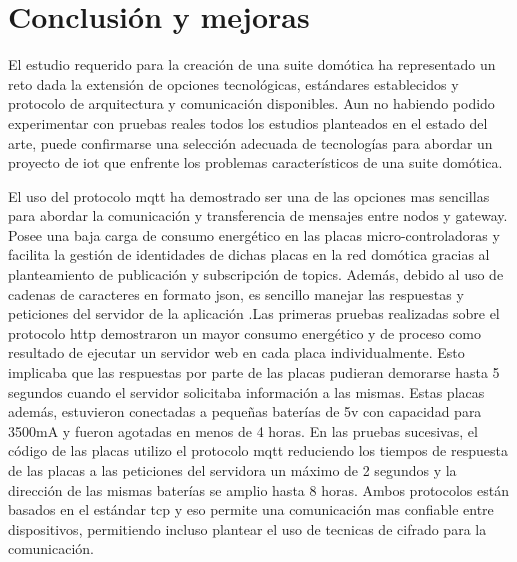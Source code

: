 \cleardoublepage

\chapter{Conclusión y mejoras}
\label{ch:Capitulo6}


El estudio requerido para la creación de una suite domótica ha representado un reto dada la extensión de opciones tecnológicas, estándares establecidos y protocolo de arquitectura y comunicación disponibles. Aun no habiendo podido experimentar con pruebas reales todos los estudios planteados en el estado del arte, puede confirmarse una selección adecuada de tecnologías para abordar un proyecto de \gls{iot} que enfrente los problemas característicos de una suite domótica.

\vspace{1cm}

El uso del protocolo \gls{mqtt} ha demostrado ser una de las opciones mas sencillas para abordar la comunicación y transferencia de mensajes entre nodos y \gls{gateway}. Posee una baja carga de consumo energético en las placas micro-controladoras y facilita la gestión de identidades de dichas placas en la red domótica gracias al planteamiento de publicación y subscripción de topics. Además, debido al uso de cadenas de caracteres en formato \gls{json}, es sencillo manejar las respuestas y peticiones del servidor de la aplicación .Las primeras pruebas realizadas sobre el protocolo \gls{http} demostraron un mayor consumo energético y de proceso como resultado de ejecutar un servidor web en cada placa individualmente. Esto implicaba que las respuestas por parte de las placas pudieran demorarse hasta 5 segundos cuando el servidor solicitaba información a las mismas. Estas placas además, estuvieron conectadas a pequeñas baterías de 5v con capacidad para 3500mA y fueron agotadas en menos de 4 horas. En las pruebas sucesivas, el código de las placas utilizo el protocolo \gls{mqtt} reduciendo los tiempos de respuesta de las placas a las peticiones del servidora un máximo de 2 segundos y la dirección de las mismas baterías se amplio hasta 8 horas. Ambos protocolos están basados en el estándar \gls{tcp} y eso permite una comunicación mas confiable entre dispositivos, permitiendo incluso plantear el uso de tecnicas de cifrado para la comunicación.

\vspace{1cm}

